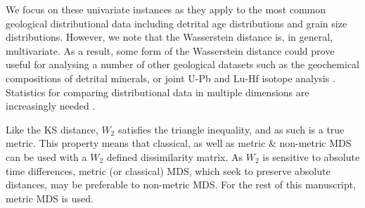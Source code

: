 \documentclass[gchron, manuscript]{article}
\begin{document}
We focus on these univariate instances as they apply to the most common geological distributional data including detrital age distributions and grain size distributions. However, we note that the Wasserstein distance is, in general, multivariate. As a result, some form of the Wasserstein distance could prove useful for analysing a number of other geological datasets such as the geochemical compositions of detrital minerals, or joint U-Pb and Lu-Hf isotope analysis \cite[see][]{vermeesch_multidimensional_2023}. Statistics for comparing distributional data in multiple dimensions are increasingly needed \citep{sundell_two-dimensional_2021}. 

Like the KS distance, $W_2$ satisfies the triangle inequality, and as such is a true metric. This property means that classical, as well as metric \& non-metric MDS can be used with a $W_2$ defined dissimilarity matrix. As $W_2$ is sensitive to absolute time differences, metric (or classical) MDS, which seek to preserve absolute distances, may be preferable to non-metric MDS. For the rest of this manuscript, metric MDS is used.  


\end{document}
